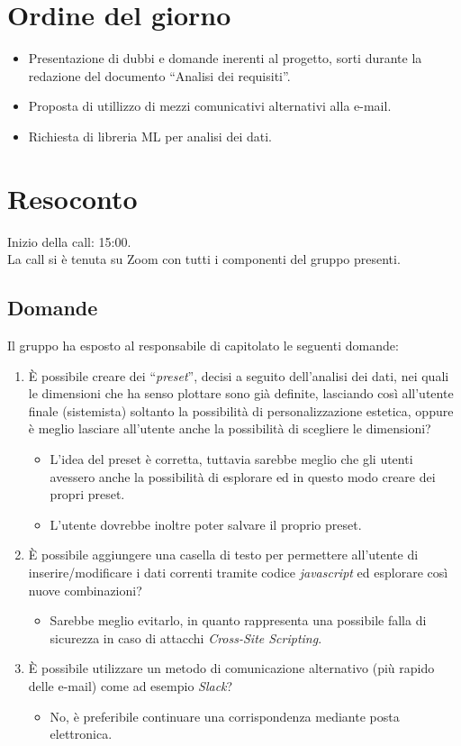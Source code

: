 \section{Ordine del giorno}

\begin{itemize}
	\item Presentazione di dubbi e domande inerenti al progetto, sorti durante la redazione del documento ``Analisi dei requisiti''.
	\item Proposta di utillizzo di mezzi comunicativi alternativi alla e-mail.
	\item Richiesta di libreria ML per analisi dei dati.
\end{itemize}

\section{Resoconto}

\noindent 
Inizio della call: 15:00. \\
\noindent La call si è tenuta su Zoom con tutti i componenti del gruppo presenti.
\subsection{Domande}
Il gruppo ha esposto al responsabile di capitolato le seguenti domande:
\begin{enumerate}
	\item È possibile creare dei ``\textit{preset}'', decisi a seguito dell'analisi dei dati, nei quali le dimensioni che ha senso plottare sono già definite, lasciando così all'utente finale (sistemista) soltanto la possibilità di personalizzazione estetica, oppure è meglio lasciare all'utente anche la possibilità di scegliere le dimensioni?
	\begin{itemize}
		\item L'idea del preset è corretta, tuttavia sarebbe meglio che gli utenti avessero anche la possibilità di esplorare ed in questo modo creare dei propri preset.
		\item L'utente dovrebbe inoltre poter salvare il proprio preset.
	\end{itemize}
	\item È possibile aggiungere una casella di testo per permettere all'utente di inserire/modificare i dati correnti tramite codice \textit{javascript} ed esplorare così nuove combinazioni?
	\begin{itemize}
		\item Sarebbe meglio evitarlo, in quanto rappresenta una possibile falla di sicurezza in caso di attacchi \textit{Cross-Site Scripting}.
	\end{itemize}
	\item È possibile utilizzare un metodo di comunicazione alternativo (più rapido delle e-mail) come ad esempio \textit{Slack}?
	\begin{itemize}
		\item No, è preferibile continuare una corrispondenza mediante posta elettronica.
	\end{itemize}
	
\end{enumerate}

